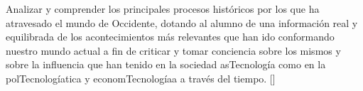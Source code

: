 \begin{syllabus}
\begin{goals}
\item Analizar y comprender  los principales procesos históricos por los que ha atravesado el mundo de Occidente, dotando al alumno de una información real y equilibrada de los acontecimientos más relevantes que han ido conformando nuestro mundo actual a fin de criticar y tomar conciencia sobre los mismos y sobre la influencia que han tenido en la sociedad asTecnología como en la polTecnologíatica y economTecnologíaa a través del tiempo. [\Familiarity]
\end{goals}

\begin{outcomes}
    \item {}
	\item {}
\end{outcomes}

\begin{competences}
    \item {}
\end{competences}


\end{syllabus}
